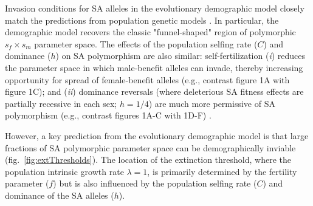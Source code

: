 \documentclass[11pt]{article}
\begin{document}
Invasion conditions for SA alleles in the evolutionary demographic model closely match the predictions from population genetic models \citep{Kidwell1977, JordanConnallon2014, Olito2017}. In particular, the demographic model recovers the classic "funnel-shaped" region of polymorphic $s_f \times s_m$ parameter space. The effects of the population selfing rate ($C$) and dominance ($h$) on SA polymorphism are also similar: self-fertilization ({\itshape i}) reduces the parameter space in which male-benefit alleles can invade, thereby increasing opportunity for spread of female-benefit alleles (e.g., contrast figure 1A with figure 1C); and ({\itshape ii}) dominance reversals (where deleterious SA fitness effects are partially recessive in each sex; $h = 1/4$) are much more permissive of SA polymorphism (e.g., contrast figures 1A-C with 1D-F) \citep{JordanConnallon2014, Olito2017}. 

However, a key prediction from the evolutionary demographic model is that large fractions of SA polymorphic parameter space can be demographically inviable (fig.~\ref{fig:extThresholds}). The location of the extinction threshold, where the population intrinsic growth rate $\lambda = 1$, is primarily determined by the fertility parameter ($f$) but is also influenced by the population selfing rate ($C$) and dominance of the SA alleles ($h$). 

\end{document}
